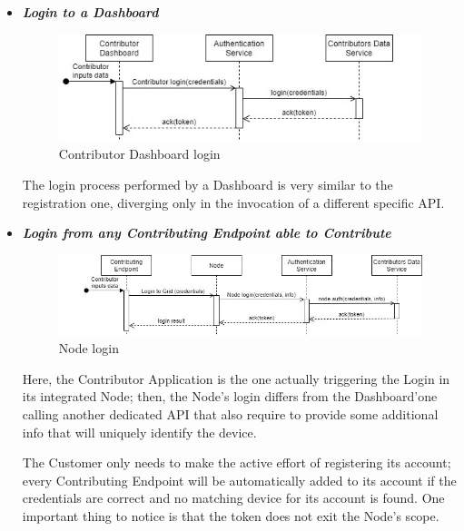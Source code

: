 \begin{itemize}
    \begin{itemize}
        \item \textbf{\textit{Login to a Dashboard}}\\
        \begin{figure}[!ht]
            \centering
            \includegraphics[scale=1]{document/chapters/chapter_6/images/use_cases_satisfaction_contributor_dashboard_login.jpg}
            \caption{Contributor Dashboard login}
            \label{fig:use_cases_satisfaction_contributor_dashboard_login}
        \end{figure}

        The login process performed by a Dashboard is very similar to the registration one, diverging only in the invocation of a different specific API.
        \vspace{4mm}

        \item \textbf{\textit{Login from any Contributing Endpoint able to Contribute}}\\
        \begin{figure}[!ht]
            \centering
            \includegraphics[scale=0.8]{document/chapters/chapter_6/images/use_cases_satisfaction_node_login.jpg}
            \caption{Node login}
            \label{fig:use_cases_satisfaction_node_login}
        \end{figure}

        Here, the Contributor Application is the one actually triggering the Login in its integrated Node; then, the Node's login differs from the Dashboard'one calling another dedicated API that also require to provide some additional info that will uniquely identify the device.
        
        The Customer only needs to make the active effort of registering its account; every Contributing Endpoint will be automatically added to its account if the credentials are correct and no matching device for its account is found.
        One important thing to notice is that the token does not exit the Node's scope.


\end{itemize}
\end{itemize}
